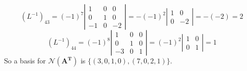 \documentclass[12pt,pdftex]{article}
\begin{document}
\[(L^{-1})_{43}=(-1)^7\left|\begin{array}{ccc} 1 & 0 & 0\\ 0& 1 & 0\\-1 &0 & -2\end{array}\right|=
-(-1)^2\left|\begin{array}{ccc} 1 & 0 \\ 0 & -2\end{array}\right|=-(-2)=2\]
\[(L^{-1})_{44}=(-1)^8\left|\begin{array}{ccc} 1 & 0 &0\\ 0 & 1 & 0\\-3 &0 & 1\end{array}\right|=
(-1)^2\left|\begin{array}{ccc} 1 & 0 \\ 0 & 1\end{array}\right|=1\]
So a basis for $\mathcal{N}(\mathbf{A^T})$ is $\{(3,0,1,0),(7,0,2,1)\}$.
\end{document}
